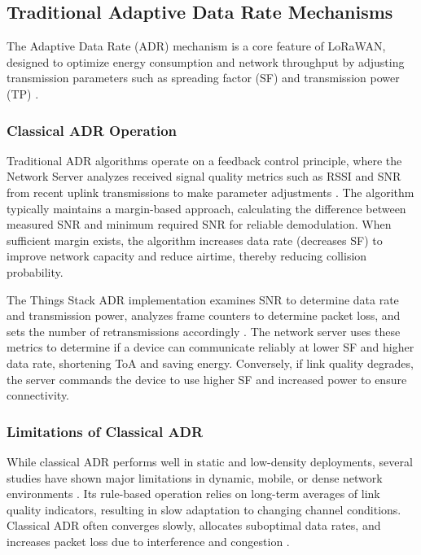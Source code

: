 \documentclass[12pt,a4paper]{article}
\begin{document}
\subsection{Traditional Adaptive Data Rate Mechanisms}

The Adaptive Data Rate (ADR) mechanism is a core feature of LoRaWAN, designed to optimize energy consumption and network throughput by adjusting transmission parameters such as spreading factor (SF) and transmission power (TP) \cite{Kufakunesu2020, Kufakunesu2020}.

\subsubsection{Classical ADR Operation}

Traditional ADR algorithms operate on a feedback control principle, where the Network Server analyzes received signal quality metrics such as RSSI and SNR from recent uplink transmissions to make parameter adjustments \cite{alGumaei2022ANovelApproach}. The algorithm typically maintains a margin-based approach, calculating the difference between measured SNR and minimum required SNR for reliable demodulation. When sufficient margin exists, the algorithm increases data rate (decreases SF) to improve network capacity and reduce airtime, thereby reducing collision probability.

The Things Stack ADR implementation examines SNR to determine data rate and transmission power, analyzes frame counters to determine packet loss, and sets the number of retransmissions accordingly \cite{TheThingsIndustriesADR}. The network server uses these metrics to determine if a device can communicate reliably at lower SF and higher data rate, shortening ToA and saving energy. Conversely, if link quality degrades, the server commands the device to use higher SF and increased power to ensure connectivity.

\subsubsection{Limitations of Classical ADR}

While classical ADR performs well in static and low-density deployments, several studies have shown major limitations in dynamic, mobile, or dense network environments \cite{Kufakunesu2020, Kufakunesu2020}. Its rule-based operation relies on long-term averages of link quality indicators, resulting in slow adaptation to changing channel conditions. Classical ADR often converges slowly, allocates suboptimal data rates, and increases packet loss due to interference and congestion \cite{FarhadPyun2023, Zholamanov2024, Farhad23-LoRaWAN-Meets-ML}.
\end{document}
